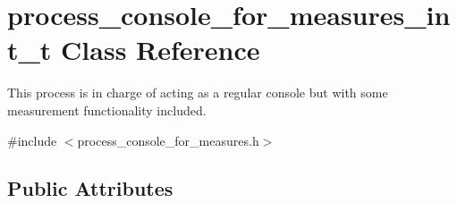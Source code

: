 \hypertarget{structprocess__console__for__measures__int__t}{}\section{process\+\_\+console\+\_\+for\+\_\+measures\+\_\+int\+\_\+t Class Reference}
\label{structprocess__console__for__measures__int__t}


This process is in charge of acting as a regular console but with some measurement functionality included.  




{\ttfamily \#include $<$process\+\_\+console\+\_\+for\+\_\+measures.\+h$>$}

\subsection*{Public Attributes}
